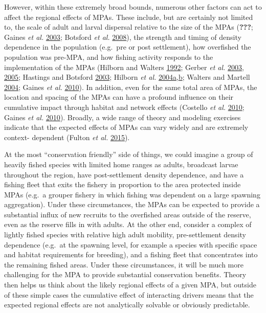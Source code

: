 \documentclass[twoside,12pt,final]{ucthesis-CA2012}
\begin{document}
\begin{ucmainmatter}
However, within these extremely broad bounds, numerous other factors can
act to affect the regional effects of MPAs. These include, but are
certainly not limited to, the scale of adult and larval dispersal
relative to the size of the MPAs ({\textbf{???}}; Gaines \emph{et al.}
\protect\hyperlink{ref-Gaines2003}{2003}; Botsford \emph{et al.}
\protect\hyperlink{ref-Botsford2008}{2008}), the strength and timing of
density dependence in the population (e.g.~pre or post settlement), how
overfished the population was pre-MPA, and how fishing activity responds
to the implementation of the MPAs (Hilborn and Walters
\protect\hyperlink{ref-Hilborn1992}{1992}; Gerber \emph{et al.}
\protect\hyperlink{ref-Gerber2003}{2003},
\protect\hyperlink{ref-Gerber2005}{2005}; Hastings and Botsford
\protect\hyperlink{ref-Hastings2003}{2003}; Hilborn \emph{et al.}
\protect\hyperlink{ref-Hilborn2004a}{2004}\protect\hyperlink{ref-Hilborn2004a}{a},\protect\hyperlink{ref-Hilborn2004}{b};
Walters and Martell \protect\hyperlink{ref-Walters2004}{2004}; Gaines
\emph{et al.} \protect\hyperlink{ref-Gaines2010}{2010}). In addition,
even for the same total area of MPAs, the location and spacing of the
MPAs can have a profound influence on their cumulative impact through
habitat and network effects (Costello \emph{et al.}
\protect\hyperlink{ref-Costello2010}{2010}; Gaines \emph{et al.}
\protect\hyperlink{ref-Gaines2010}{2010}). Broadly, a wide range of
theory and modeling exercises indicate that the expected effects of MPAs
can vary widely and are extremely context- dependent (Fulton \emph{et
al.} \protect\hyperlink{ref-Fulton2015}{2015}).

At the most ``conservation friendly'' side of things, we could imagine a
group of heavily fished species with limited home ranges as adults,
broadcast larvae throughout the region, have post-settlement density
dependence, and have a fishing fleet that exits the fishery in
proportion to the area protected inside MPAs (e.g.~a grouper fishery in
which fishing was dependent on a large spawning aggregation). Under
these circumstances, the MPAs can be expected to provide a substantial
influx of new recruits to the overfished areas outside of the reserve,
even as the reserve fills in with adults. At the other end, consider a
complex of lightly fished species with relative high adult mobility,
pre-settlement density dependence (e.g.~at the spawning level, for
example a species with specific space and habitat requirements for
breeding), and a fishing fleet that concentrates into the remaining
fished areas. Under these circumstances, it will be much more
challenging for the MPA to provide substantial conservation benefits.
Theory then helps us think about the likely regional effects of a given
MPA, but outside of these simple cases the cumulative effect of
interacting drivers means that the expected regional effects are not
analytically solvable or obviously predictable.


\end{ucmainmatter}
\end{document}
